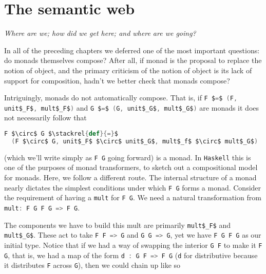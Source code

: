 

\chapter{The semantic web}
\begin{center}
{\small\em Where are we; how did we get here; and where are we going?}
\end{center}

In all of the preceding chapters we deferred one of the most important
questions: do monads themselves compose? After all, if monad is the
proposal to replace the notion of object, and the primary criticism of
the notion of object is its lack of support for composition, hadn't we
better check that monads compose?

Intriguingly, monads do not automatically compose. That is, if
\lstinline[language=Scala,mathescape=true]!F $=$ (F, unit$_F$, mult$_F$)!
and \lstinline[language=Scala,mathescape=true]!G $=$ (G, unit$_G$, mult$_G$)!
are monads it does not necessarily follow that

\begin{lstlisting}[language=Scala,mathescape=true]
  F $\circ$ G $\stackrel{def}{=}$
  (F $\circ$ G, unit$_F$ $\circ$ unit$_G$, mult$_f$ $\circ$ mult$_G$)
\end{lstlisting}

(which we'll write simply as
\lstinline[language=Scala,mathescape=true]!F G! going forward) is a
monad. In \texttt{Haskell} this is one of the purposes of monad
transformers, to sketch out a compositional model for monads. Here, we
follow a different route. The internal structure of a monad nearly
dictates the simplest conditions under which
\lstinline[language=Scala,mathescape=true]!F G! forms a
monad. Consider the requirement of having a
\lstinline[language=Scala,mathescape=true]!mult! for
\lstinline[language=Scala,mathescape=true]!F G!. We need a natural
transformation from \lstinline[language=Scala,mathescape=true]!mult: F G F G => F G!.

The components we have to build this mult are primarily
\lstinline[language=Scala,mathescape=true]!mult$_F$! and
\lstinline[language=Scala,mathescape=true]!mult$_G$!. These act to
take \lstinline[language=Scala,mathescape=true]!F F => G! and
\lstinline[language=Scala,mathescape=true]!G G => G!, yet we have
\lstinline[language=Scala,mathescape=true]!F G F G! as our initial
type. Notice that if we had a way of swapping the interior
\lstinline[language=Scala,mathescape=true]!G F! to make it
\lstinline[language=Scala,mathescape=true]!F G!, that is, we had a map
of the form \lstinline[language=Scala,mathescape=true]!d : G F => F G!
(\lstinline[language=Scala,mathescape=true]!d! for distributive
because it distributes \lstinline[language=Scala,mathescape=true]!F!
across \lstinline[language=Scala,mathescape=true]!G!), then we could
chain up like so

